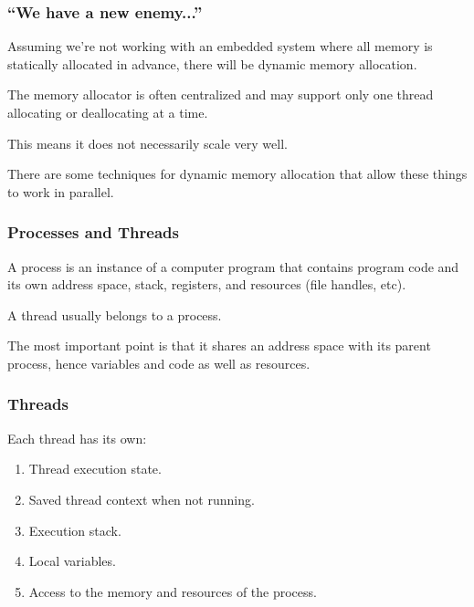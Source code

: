 \begin{frame}
\frametitle{``We have a new enemy...''}

Assuming we're not working with an embedded system where all memory is statically allocated in advance, there will be dynamic memory allocation. 

The memory allocator is often centralized and may support only one thread allocating or deallocating at a time. 

This means it does not necessarily scale very well.

There are some techniques for dynamic memory allocation that allow these things to work in parallel.


\end{frame}



\begin{frame}
\frametitle{Processes and Threads}
A \alert{process} is an
instance of a computer program that contains program code and its own
address space, stack, registers, and resources (file handles, etc).  

A
\alert{thread} usually belongs to a process. 

The most important point
is that it shares an address space with its parent process, hence
variables and code as well as resources.


\end{frame}



\begin{frame}
\frametitle{Threads}

Each thread has its own:
\begin{enumerate}
	\item Thread execution state.
	\item Saved thread context when not running.
	\item Execution stack.
	\item Local variables.
	\item Access to the memory and resources of the process.
\end{enumerate}


\end{frame}



